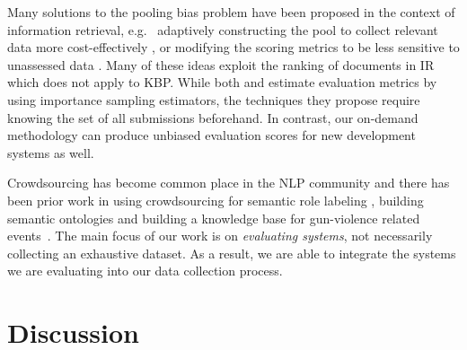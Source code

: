Many solutions to the pooling bias problem have been proposed in the context of information retrieval, e.g.\ 
  adaptively constructing the pool to collect relevant data more cost-effectively \citep{zobel1998reliable,cormack1998efficient,aslam2006statistical}, or
  modifying the scoring metrics to be less sensitive to unassessed data \citep{buckley2004incomplete,sakai2008information,aslam2006statistical}.
Many of these ideas exploit the ranking of documents in IR which does not apply to KBP.\@
While both \citet{aslam2006statistical} and \citet{yilmaz2008simple} estimate evaluation metrics by using importance sampling estimators, the techniques they propose require knowing the set of all submissions beforehand.
In contrast, our on-demand methodology can produce unbiased evaluation scores for new development systems as well.

Crowdsourcing has become common place in the NLP community and there has been prior work in using crowdsourcing for semantic role labeling \citep{he2015question}, building semantic ontologies \citep{vannella2014validating} and building a knowledge base for gun-violence related events~\cite{pavlick2016gun}.
The main focus of our work is on \textit{evaluating systems}, not necessarily collecting an exhaustive dataset. As a result, we are able to integrate the systems we are evaluating into our data collection process.

\section{Discussion}
\label{sec:discussion}

